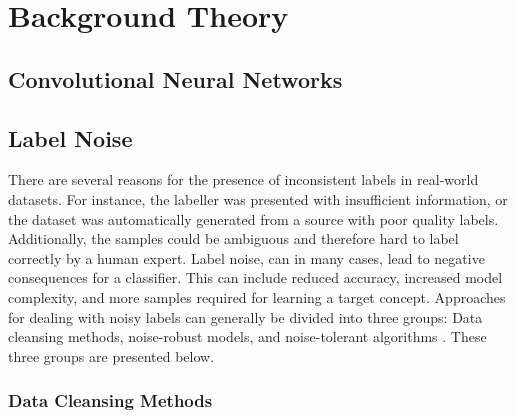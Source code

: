 \section{Background Theory}
\label{sec:background_theory}
\subsection{Convolutional Neural Networks}

\label{sec:convolutional_networks_background}

\subsection{Label Noise}
\label{sec:background_label_noise}
There are several reasons for the presence of inconsistent labels in real-world datasets. For instance, the labeller was presented with insufficient information, or the dataset was automatically generated from a source with poor quality labels. Additionally, the samples could be ambiguous and therefore hard to label correctly by a human expert. Label noise, can in many cases, lead to negative consequences for a classifier. This can include reduced accuracy, increased model complexity, and more samples required for learning a target concept. Approaches for dealing with noisy labels can generally be divided into three groups: Data cleansing methods, noise-robust models, and noise-tolerant algorithms \citep{Frenay_label_noise_survey}. These three groups are presented below.  \\






\subsubsection{Data Cleansing Methods}

